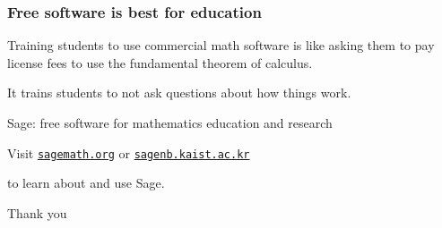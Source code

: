 \documentclass{beamer}
\newcommand{\myhref}[1]{\href{http://#1}{\texttt{#1}}}
\newcommand{\blankline}{\vspace{\baselineskip}}
\begin{document}
\begin{frame}
  \frametitle{Free software is best for education}

  Training students to use commercial math software is like asking them
  to pay license fees to use the fundamental theorem of calculus.

  \pause \blankline

  It trains students to not ask questions about how things work.  
  
\end{frame}

\begin{frame}

  \begin{center}
    \Large Sage: free software for mathematics education and research
  \end{center}
  
\end{frame}

\begin{frame}
  \begin{center}
    Visit \myhref{sagemath.org} or \myhref{sagenb.kaist.ac.kr}

    to learn about and use Sage.

    \blankline

    Thank you
  \end{center}

\end{frame}
\end{document}
